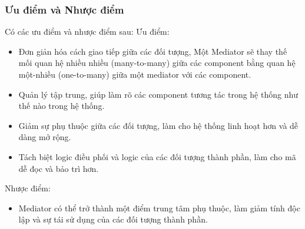 \subsubsection{Ưu điểm và Nhược điểm}
Có các ưu điểm và nhược điểm sau:
Ưu điểm:
\begin{itemize}
    \item Đơn giản hóa cách giao tiếp giữa các đối tượng, Một Mediator sẽ thay thế mối quan hệ nhiều nhiều (many-to-many) giữa các component bằng quan hệ một-nhiều (one-to-many) giữa một mediator với các component.
    \item Quản lý tập trung, giúp làm rõ các component tương tác trong hệ thống như thế nào trong hệ thống.
    \item Giảm sự phụ thuộc giữa các đối tượng, làm cho hệ thống linh hoạt hơn và dễ dàng mở rộng.
    \item Tách biệt logic điều phối và logic của các đối tượng thành phần, làm cho mã dễ đọc và bảo trì hơn.
\end{itemize}
Nhược điểm:
\begin{itemize}
    \item Mediator có thể trở thành một điểm trung tâm phụ thuộc, làm giảm tính độc lập và sự tái sử dụng của các đối tượng thành phần.
\end{itemize}
